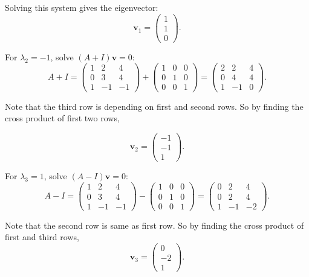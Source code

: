 \documentclass[
  letterpaper,
  DIV=11,
  numbers=noendperiod]{scrreprt}
\theoremstyle{plain}
\theoremstyle{definition}
\theoremstyle{remark}
\begin{document}
Solving this system gives the eigenvector: \[
\mathbf{v}_1 = \begin{pmatrix} 1 \\ 1 \\ 0 \end{pmatrix}.
\]

For \(\lambda_2 = -1\), solve \((A +I)\mathbf{v} = 0\): \[
A +I = \begin{pmatrix} 1 & 2 & 4 \\ 0 & 3 & 4 \\ 1 & -1 & -1 \end{pmatrix} +\begin{pmatrix} 1 & 0 & 0 \\ 0 & 1 & 0 \\ 0 & 0 & 1 \end{pmatrix} = \begin{pmatrix} 2 & 2 & 4 \\ 0 & 4 & 4 \\ 1 & -1 & 0 \end{pmatrix}.
\]

Note that the third row is depending on first and second rows. So by
finding the cross product of first two rows,

\[
\mathbf{v}_2 = \begin{pmatrix} -1 \\ -1 \\ 1 \end{pmatrix}.
\]

For \(\lambda_3 = 1\), solve \((A -I)\mathbf{v} = 0\): \[
A - I = \begin{pmatrix} 1 & 2 & 4 \\ 0 & 3 & 4 \\ 1 & -1 & -1 \end{pmatrix} -\begin{pmatrix} 1 & 0 & 0 \\ 0 & 1 & 0 \\ 0 & 0 & 1 \end{pmatrix} = \begin{pmatrix} 0 & 2 & 4 \\ 0 & 2 & 4 \\ 1 & -1 & -2\end{pmatrix}.
\]

Note that the second row is same as first row. So by finding the cross
product of first and third rows, \[
\mathbf{v}_3 = \begin{pmatrix} 0 \\ -2 \\ 1 \end{pmatrix}.
\]
\end{document}
